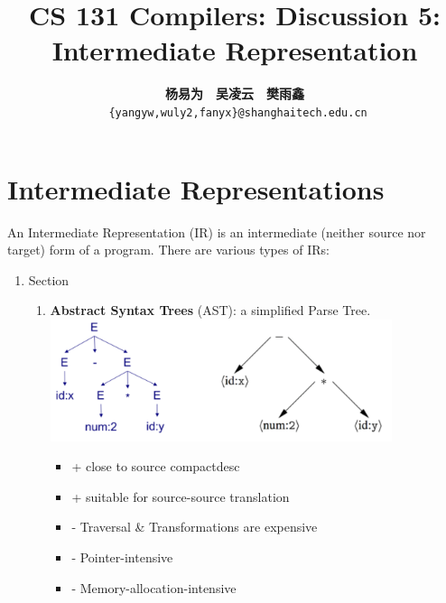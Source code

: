\documentclass[a4paper]{exam}
\title{CS 131 Compilers: Discussion 5: Intermediate Representation}
\author{\textbf{杨易为}~~\textbf{吴凌云}~~\textbf{樊雨鑫} \\ \texttt{ \{yangyw,wuly2,fanyx\}@shanghaitech.edu.cn}}
\theoremstyle{definition}
\begin{document}
\maketitle
\section{Intermediate Representations}
An Intermediate Representation (IR) is an intermediate (neither source nor target) form of a program. There are various types of IRs:
\begin{enumerate}
  \item Section
        \begin{enumerate}
          \item \textbf{Abstract Syntax Trees} (AST): a simplified Parse Tree.\\
                \includegraphics[width=10cm]{img/Snipaste_2021-04-19_07-08-30.png}
                \begin{itemize}
                  \item + close to source compactdesc
                  \item + suitable for source-source translation
                  \item - Traversal \& Transformations are expensive
                  \item - Pointer-intensive
                  \item - Memory-allocation-intensive
                \end{itemize}


\end{enumerate}
\end{enumerate}
\end{document}
